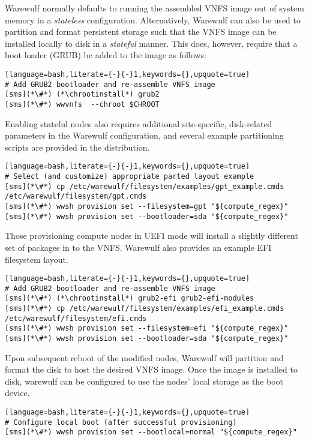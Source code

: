 Warewulf normally defaults to running the assembled VNFS image out of system
memory in a {\em stateless} configuration. Alternatively, Warewulf can also be
used to partition and format persistent storage such that the VNFS image can be
installed locally to disk in a {\em stateful} manner.  This does, however,
require that a boot loader (GRUB) be added to the image as follows:

\begin{lstlisting}[language=bash,literate={-}{-}1,keywords={},upquote=true]
# Add GRUB2 bootloader and re-assemble VNFS image
[sms](*\#*) (*\chrootinstall*) grub2
[sms](*\#*) wwvnfs  --chroot $CHROOT
\end{lstlisting}

\noindent Enabling stateful nodes also requires additional site-specific, disk-related
parameters in the Warewulf configuration, and several example partitioning scripts are 
provided in the distribution. 

\begin{lstlisting}[language=bash,literate={-}{-}1,keywords={},upquote=true]
# Select (and customize) appropriate parted layout example
[sms](*\#*) cp /etc/warewulf/filesystem/examples/gpt_example.cmds /etc/warewulf/filesystem/gpt.cmds
[sms](*\#*) wwsh provision set --filesystem=gpt "${compute_regex}" 
[sms](*\#*) wwsh provision set --bootloader=sda "${compute_regex}" 
\end{lstlisting}

\begin{center}
\begin{tcolorbox}[]
\small
Those provisioning compute nodes in UEFI mode will install a slightly different
set of packages in to the VNFS. Warewulf also provides an example EFI filesystem
layout.
\begin{lstlisting}[language=bash,literate={-}{-}1,keywords={},upquote=true]
# Add GRUB2 bootloader and re-assemble VNFS image
[sms](*\#*) (*\chrootinstall*) grub2-efi grub2-efi-modules
[sms](*\#*) cp /etc/warewulf/filesystem/examples/efi_example.cmds /etc/warewulf/filesystem/efi.cmds
[sms](*\#*) wwsh provision set --filesystem=efi "${compute_regex}" 
[sms](*\#*) wwsh provision set --bootloader=sda "${compute_regex}" 
\end{lstlisting}
\end{tcolorbox}
\end{center}

\noindent Upon subsequent reboot of the modified nodes, Warewulf will partition
and format the disk to host the desired VNFS image.  Once the image is installed 
to disk, warewulf can be configured to use the nodes' local storage as the boot 
device.

\begin{lstlisting}[language=bash,literate={-}{-}1,keywords={},upquote=true]
# Configure local boot (after successful provisioning)
[sms](*\#*) wwsh provision set --bootlocal=normal "${compute_regex}"
\end{lstlisting}
